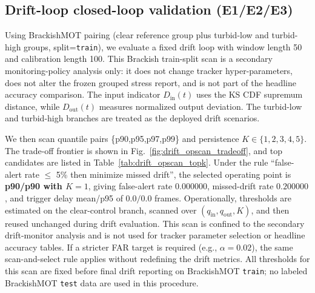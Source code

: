 \documentclass[5p,twocolumn,a4paper]{elsarticle}
\providecommand{\FloatBarrier}{\par}
\newcommand{\CEAfitcoltable}[1]{%
\begingroup
\scriptsize
\setlength{\tabcolsep}{2.6pt}%
\renewcommand{\arraystretch}{1.04}%
\resizebox{\columnwidth}{!}{#1}%
\endgroup
}
\begin{document}
\begin{table}[htbp]
\centering
\caption{Gating-threshold sensitivity at seed=0 (Base and +gating).}
\label{tab:gating_sensitivity}
\CEAfitcoltable{}
\end{table}

\begin{table}[htbp]
\centering
\caption{Gating activation rates on the frozen split (seed=0).}
\label{tab:gating_activation_rates}
\CEAfitcoltable{}
\end{table}

\FloatBarrier

\subsection{Drift-loop closed-loop validation (E1/E2/E3)}
Using BrackishMOT pairing (clear reference group plus turbid-low and turbid-high groups, split=\texttt{train}), we evaluate a fixed drift loop with window length 50 and calibration length 100. This Brackish train-split scan is a secondary monitoring-policy analysis only: it does not change tracker hyper-parameters, does not alter the frozen grouped stress report, and is not part of the headline accuracy comparison. The input indicator $D_{\mathrm{in}}(t)$ uses the \textsc{KS} \textsc{CDF} supremum distance, while $D_{\mathrm{out}}(t)$ measures normalized output deviation. The turbid-low and turbid-high branches are treated as the deployed drift scenarios.

We then scan quantile pairs \{p90,p95,p97,p99\} and persistence $K \in \{1,2,3,4,5\}$. The trade-off frontier is shown in Fig.~\ref{fig:drift_opscan_tradeoff}, and top candidates are listed in Table~\ref{tab:drift_opscan_topk}. Under the rule ``false-alert rate $\leq$ 5\% then minimize missed drift'', the selected operating point is \textbf{p90/p90 with $K=1$}, giving false-alert rate $0.000000$, missed-drift rate $0.200000$, and trigger delay mean/p95 of $0.0/0.0$ frames.
Operationally, thresholds are estimated on the clear-control branch, scanned over $(q_{\mathrm{in}},q_{\mathrm{out}},K)$, and then reused unchanged during drift evaluation. This scan is confined to the secondary drift-monitor analysis and is not used for tracker parameter selection or headline accuracy tables. If a stricter FAR target is required (e.g., $\alpha=0.02$), the same scan-and-select rule applies without redefining the drift metrics.
All thresholds for this scan are fixed before final drift reporting on BrackishMOT \texttt{train}; no labeled BrackishMOT \texttt{test} data are used in this procedure.
\end{document}
